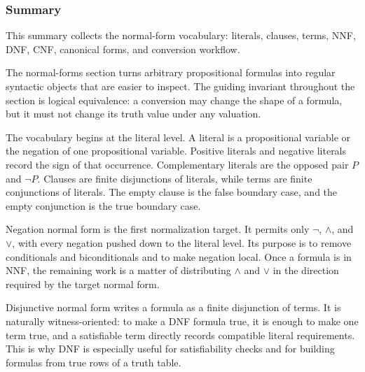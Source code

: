 \subsubsection*{Summary}

\begin{tcolorbox}[
  colback=gray!6,
  colframe=gray!40,
  arc=2pt,
  left=8pt, right=8pt, top=6pt, bottom=6pt,
  title={\small\textbf{Toolkit}},
  fonttitle=\small\bfseries
]
This summary collects the normal-form vocabulary: literals, clauses, terms,
NNF, DNF, CNF, canonical forms, and conversion workflow.
\end{tcolorbox}

\begin{remark*}[Exposition]
The normal-forms section turns arbitrary propositional formulas into regular
syntactic objects that are easier to inspect. The guiding invariant throughout
the section is logical equivalence: a conversion may change the shape of a
formula, but it must not change its truth value under any valuation.
\end{remark*}

\begin{remark*}
The vocabulary begins at the literal level. A literal is a propositional
variable or the negation of one propositional variable. Positive literals and
negative literals record the sign of that occurrence. Complementary literals
are the opposed pair \(P\) and \(\neg P\). Clauses are finite disjunctions of
literals, while terms are finite conjunctions of literals. The empty clause is
the false boundary case, and the empty conjunction is the true boundary case.
\end{remark*}

\begin{remark*}
Negation normal form is the first normalization target. It permits only
\(\neg\), \(\land\), and \(\lor\), with every negation pushed down to the
literal level. Its purpose is to remove conditionals and biconditionals and to
make negation local. Once a formula is in NNF, the remaining work is a matter
of distributing \(\land\) and \(\lor\) in the direction required by the target
normal form.
\end{remark*}

\begin{remark*}
Disjunctive normal form writes a formula as a finite disjunction of terms. It
is naturally witness-oriented: to make a DNF formula true, it is enough to make
one term true, and a satisfiable term directly records compatible literal
requirements. This is why DNF is especially useful for satisfiability checks
and for building formulas from true rows of a truth table.
\end{remark*}

